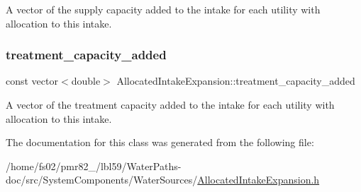 A vector of the supply capacity added to the intake for each utility with allocation to this intake. 

\mbox{\label{classAllocatedIntakeExpansion_a22f6d50982db1cf862e81672612abdb9}} 
\subsubsection{\texorpdfstring{treatment\+\_\+capacity\+\_\+added}{treatment\_capacity\_added}}
{\footnotesize\ttfamily const vector$<$double$>$ Allocated\+Intake\+Expansion\+::treatment\+\_\+capacity\+\_\+added}



A vector of the treatment capacity added to the intake for each utility with allocation to this intake. 



The documentation for this class was generated from the following file\+:\begin{DoxyCompactItemize}
\item 
/home/fs02/pmr82\+\_/lbl59/\+Water\+Paths-\/doc/src/\+System\+Components/\+Water\+Sources/\mbox{\hyperlink{AllocatedIntakeExpansion_8h}{Allocated\+Intake\+Expansion.\+h}}\end{DoxyCompactItemize}
